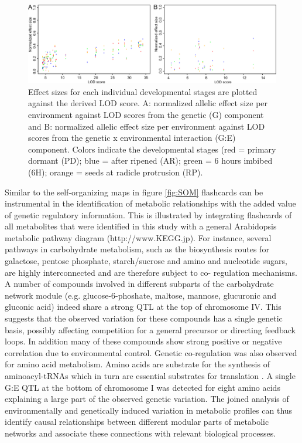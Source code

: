 \begin{figure}[h!]
  \centering
  \includegraphics[keepaspectratio,scale=0.30]{eps/image_3_2_3.eps}
  \caption[Effect sizes]{Effect sizes for each individual developmental stages are plotted against the derived 
          LOD score. A: normalized allelic effect size per environment against LOD scores from the genetic (G) 
          component and B: normalized allelic effect size per environment against LOD scores from the genetic 
          x environmental interaction (G:E) component. Colors indicate the developmental stages (red = primary 
          dormant (PD); blue = after ripened (AR); green = 6 hours imbibed (6H); orange = seeds at radicle protrusion (RP).}
          \label{fig:effectSizes}
\end{figure}

Similar to the self-organizing maps in figure \ref{fig:SOM} flashcards can be instrumental in the identification of 
metabolic relationships with the added value of genetic regulatory information. This is illustrated by 
integrating flashcards of all metabolites that were identified in this study with a general Arabidopsis 
metabolic pathway diagram (http://www.KEGG.jp). For instance, several pathways in 
carbohydrate metabolism, such as the biosynthesis routes for galactose, pentose phosphate, starch/sucrose 
and amino and nucleotide sugars, are highly interconnected and are therefore subject to co- regulation 
mechanisms. A number of compounds involved in different subparts of the carbohydrate network module (e.g. 
glucose-6-phoshate, maltose, mannose, glucuronic and gluconic acid) indeed share a strong QTL at the top 
of chromosome IV. This suggests that the observed variation for these compounds has a single genetic basis, 
possibly affecting competition for a general precursor or directing feedback loops. In addition many of 
these compounds show strong positive or negative correlation due to environmental control. Genetic 
co-regulation was also observed for amino acid metabolism. Amino acids are substrate for the synthesis of 
aminoacyl-tRNAs which in turn are essential substrates for translation \cite{Sheppard:2008}. A single 
G:E QTL at the bottom of chromosome I was detected for eight amino acids explaining a large part of the 
observed genetic variation. The joined analysis of environmentally and genetically induced variation in 
metabolic profiles can thus identify causal relationships between different modular parts of metabolic 
networks and associate these connections with relevant biological processes.

